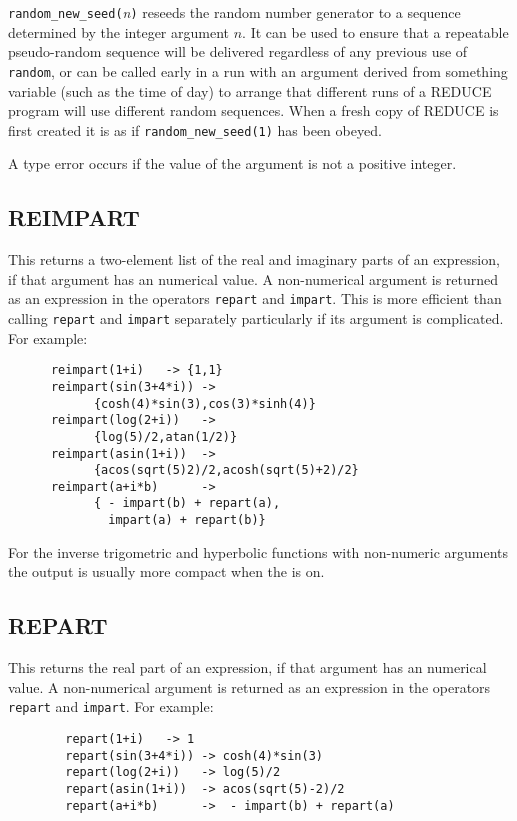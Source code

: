 \texttt{random\_new\_seed(}\emph{n}\texttt{)} reseeds the random number
generator
to a sequence determined by the integer argument $n$.  It can be used to
ensure that a repeatable pseudo-random sequence will be delivered
regardless of any previous use of \texttt{random}, or can be called early in
a run with an argument derived from something variable (such as the time
of day) to arrange that different runs of a REDUCE program will use
different random sequences.  When a fresh copy of REDUCE is first created
it is as if \texttt{random\_new\_seed(1)} has been obeyed.

A type error occurs if the value of the argument is not a positive integer.

\subsection{REIMPART}
\hypertarget{operator:REIMPART}{}
This returns a two-element list of the real and imaginary parts of an
expression, if that argument has an
numerical value.  A non-numerical argument is returned as an expression in
the operators \texttt{repart} and \texttt{impart}.
This is more efficient than calling \texttt{repart} and \texttt{impart}
separately particularly if its argument is complicated.
For example:
\begin{verbatim}
      reimpart(1+i)   -> {1,1}
      reimpart(sin(3+4*i)) ->
            {cosh(4)*sin(3),cos(3)*sinh(4)}
      reimpart(log(2+i))   ->
            {log(5)/2,atan(1/2)}
      reimpart(asin(1+i))  ->
            {acos(sqrt(5)2)/2,acosh(sqrt(5)+2)/2}
      reimpart(a+i*b)      ->
            { - impart(b) + repart(a),
              impart(a) + repart(b)}
\end{verbatim}
For the inverse trigometric and hyperbolic functions with non-numeric arguments the output is usually more compact when the  is on.

\subsection{REPART}
\hypertarget{operator:REPART}{}
This returns the real part of an expression, if that argument has an
numerical value.  A non-numerical argument is returned as an expression in
the operators \texttt{repart} and \texttt{impart}.
For example:
\begin{verbatim}
        repart(1+i)   -> 1
        repart(sin(3+4*i)) -> cosh(4)*sin(3)
        repart(log(2+i))   -> log(5)/2
        repart(asin(1+i))  -> acos(sqrt(5)-2)/2
        repart(a+i*b)      ->  - impart(b) + repart(a)
\end{verbatim}

